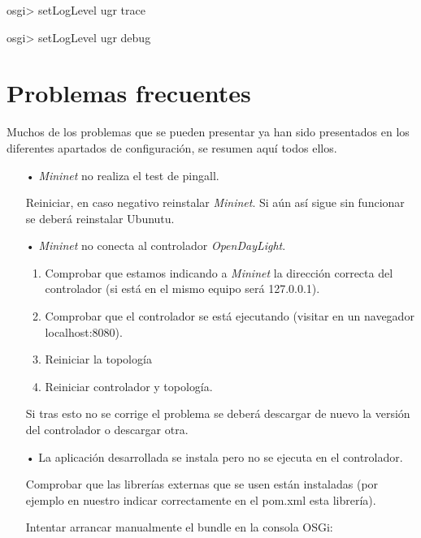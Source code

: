 \documentclass[a4paper,11pt]{book}
\begin{document}
\begin{python}
osgi> setLogLevel ugr trace
\end{python}

\begin{python}
osgi> setLogLevel ugr debug
\end{python}

\newpage
\section{Problemas frecuentes}\label{problemas}
Muchos de los problemas que se pueden presentar ya han sido presentados en los diferentes apartados de configuración, se resumen aquí todos ellos.

\begin{itemize}
\item[•] \emph{Mininet} no realiza el test de pingall. 

Reiniciar, en caso negativo reinstalar \emph{Mininet}. Si aún así sigue sin funcionar se deberá reinstalar Ubunutu.

\item[•] \emph{Mininet} no conecta al controlador \emph{OpenDayLight}. 

\begin{enumerate}
\item Comprobar que estamos indicando a \emph{Mininet} la dirección correcta del controlador (si está en el mismo equipo será 127.0.0.1). 

\item Comprobar que el controlador se está ejecutando (visitar en un navegador localhost:8080).

\item Reiniciar la topología

\item Reiniciar controlador y topología.
\end{enumerate}

Si tras esto no se corrige el problema se deberá descargar de nuevo la versión del controlador o descargar otra.

\item[•] La aplicación desarrollada se instala pero no se ejecuta en el controlador.

Comprobar que las librerías externas que se usen están instaladas (por ejemplo en nuestro indicar correctamente en el pom.xml esta librería).

Intentar arrancar manualmente el bundle en la consola OSGi:


\end{itemize}
\end{document}
